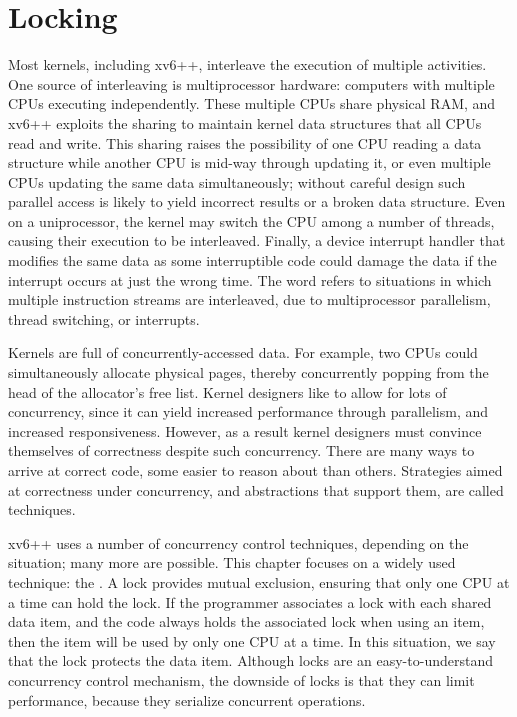 \chapter{Locking}
\label{CH:LOCK}

Most kernels, including xv6++, interleave the execution
of multiple activities.
One source of interleaving is multiprocessor hardware:
computers with
multiple CPUs executing independently.
These multiple CPUs share physical RAM,
and xv6++ exploits the sharing to maintain kernel
data structures that all CPUs read and write.
This sharing raises the possibility of
one CPU reading a data structure while another
CPU is mid-way through updating it, or even
multiple CPUs updating the same data simultaneously;
without careful design such parallel access is likely
to yield incorrect results or a broken data structure.
Even on a uniprocessor, the kernel may switch the CPU among
a number of threads, causing their execution to be interleaved.
Finally, a device interrupt handler that modifies
the same data as some interruptible code could damage
the data if the interrupt occurs at just the wrong time.
The word
refers to situations in which
multiple instruction streams are interleaved,
due to multiprocessor parallelism,
thread switching, or interrupts.

Kernels are full of concurrently-accessed data. For example, two CPUs
could simultaneously allocate physical pages, thereby concurrently
popping from the head of the allocator's free list. Kernel designers like to allow
for lots of concurrency, since it can yield increased performance
through parallelism, and increased responsiveness. However, as a result
kernel designers must convince themselves of
correctness despite such concurrency. There are many ways to arrive at
correct code, some easier to reason about than others. Strategies
aimed at correctness under concurrency, and abstractions that support
them, are called  techniques.

xv6++ uses a number of concurrency control techniques, depending on the
situation; many more are possible. This chapter focuses on a widely
used technique: the .  A lock provides mutual
exclusion, ensuring that only one CPU at a time can hold the lock. If
the programmer associates a lock with each shared data item, and the
code always holds the associated lock when using an item, then the
item will be used by only one CPU at a time.  In this situation, we
say that the lock protects the data item.  Although locks are an
easy-to-understand concurrency control mechanism, the downside of
locks is that they can limit performance, because they serialize
concurrent operations.

